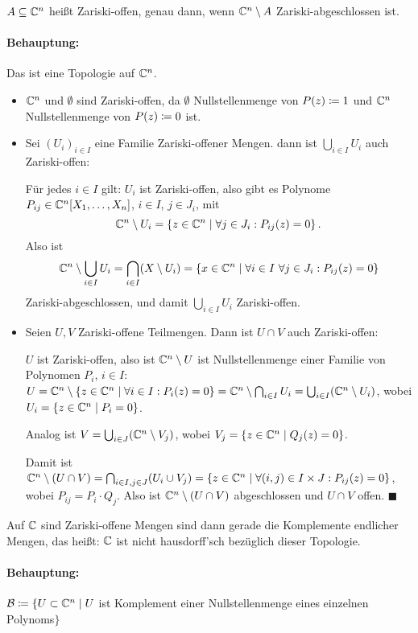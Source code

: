 \documentclass{article}
\begin{document}
$A \subseteq \mathbb{C}^n$ heißt Zariski-offen, genau dann, wenn $\mathbb{C}^n\setminus A$ Zariski-abgeschlossen ist.

\paragraph{Behauptung:} Das ist eine Topologie auf $\mathbb{C}^n$.
\begin{itemize}
\item $\mathbb{C}^n$ und $\emptyset$ sind Zariski-offen, da $\emptyset$ Nullstellenmenge von $P(z)\mathrel{\mbox{$\coloneqq$}}1$ und $\mathbb{C}^n$ Nullstellenmenge von $P(z)\mathrel{\mbox{$\coloneqq$}}0$ ist.

\item Sei $(U_i)_{i\in I}$ eine Familie Zariski-offener Mengen. dann ist $\bigcup_{i\in I} U_i$ auch Zariski-offen:

Für jedes $i\in I$ gilt: $U_i$ ist Zariski-offen, also gibt es Polynome $P_{ij}\in \mathbb{C}^n[X_1,\ldots,X_n]$, $i\in I$, $j\in J_i$, mit
\[\mathbb{C}^n\setminus U_i = \{ z\in \mathbb{C}^n \mid \forall j\in J_i: P_{ij}(z) = 0\}\,.\]
Also ist 
\[\MdC^n\setminus \bigcup_{i\in I} U_i = \bigcap_{i\in I}(X\setminus U_i) = \{x\in \MdC^n \mid \forall i\in I \ \forall j\in J_i : P_{ij}(z) = 0 \}\]
Zariski-abgeschlossen, und damit $\bigcup_{i\in I} U_i$ Zariski-offen.
\item Seien $U,V$ Zariski-offene Teilmengen. Dann ist $U\cap V$ auch Zariski-offen:

$U$ ist Zariski-offen, also ist $\mathbb{C}^n\setminus U$ ist Nullstellenmenge einer Familie von Polynomen $P_i$, $i\in I$: $U = \mathbb{C}^n \setminus \{ z\in \mathbb{C}^n \mid \forall i \in I: P_i(z)=0\} = \mathbb{C}^n\setminus \bigcap_{i\in I}U_i = \bigcup_{i\in I}(\mathbb{C}^n \setminus U_i)$, wobei $U_i = \{z \in \mathbb{C}^n \mid P_i = 0\}$.

Analog ist $V = \bigcup_{i\in J}(\mathbb{C}^n \setminus V_j)$, wobei $V_j = \{z \in \mathbb{C}^n \mid Q_j(z) =0\}$.

Damit ist $\mathbb{C}^n \setminus (U\cap V) = \bigcap_{i\in I, j\in J}(U_i \cup V_j) = \{z\in \mathbb{C}^n \mid \forall (i,j)\in I\times J: P_{ij}(z)=0 \}$, wobei $P_{ij} = P_i\cdot Q_j$. Also ist $\mathbb{C}^n\setminus(U\cap V)$ abgeschlossen und $U\cap V$ offen.
\hfill$\blacksquare$
\end{itemize}

Auf $\mathbb{C}$ sind Zariski-offene Mengen sind dann gerade die Komplemente endlicher Mengen, das heißt: $\mathbb{C}$ ist nicht hausdorff’sch bezüglich dieser Topologie.

\paragraph{Behauptung:} $\mathcal B \mathrel{\mbox{$\coloneqq$}} \{U \subset \mathbb{C}^n \mid U$ ist Komplement einer Nullstellenmenge eines einzelnen Polynoms$\}$
\end{document}
